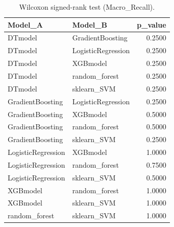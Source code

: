 \begin{table}[t]
\centering
\begin{tabular}{llr}
\toprule
Model_A & Model_B & p_value \\
\midrule
DTmodel & GradientBoosting & 0.2500 \\
DTmodel & LogisticRegression & 0.2500 \\
DTmodel & XGBmodel & 0.2500 \\
DTmodel & random_forest & 0.2500 \\
DTmodel & sklearn_SVM & 0.2500 \\
GradientBoosting & LogisticRegression & 0.2500 \\
GradientBoosting & XGBmodel & 0.5000 \\
GradientBoosting & random_forest & 0.5000 \\
GradientBoosting & sklearn_SVM & 0.2500 \\
LogisticRegression & XGBmodel & 1.0000 \\
LogisticRegression & random_forest & 0.7500 \\
LogisticRegression & sklearn_SVM & 0.5000 \\
XGBmodel & random_forest & 1.0000 \\
XGBmodel & sklearn_SVM & 1.0000 \\
random_forest & sklearn_SVM & 1.0000 \\
\bottomrule
\end{tabular}
\caption{Wilcoxon signed-rank test (Macro_Recall).}
\label{tab:wilcoxon_Macro_Recall}
\end{table}